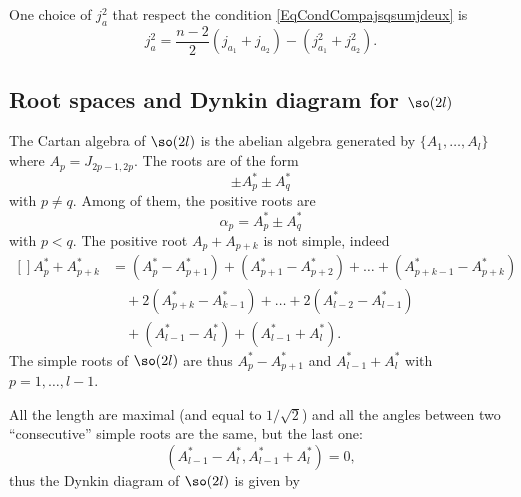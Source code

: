 One choice of $j_a^2$ that respect the condition \eqref{EqCondCompajsqsumjdeux} is
\begin{equation}
	j_a^2=\frac{ n-2 }{2}(j_{a_1}+j_{a_2})-(j_{a_1}^2+j_{a_2}^2).
\end{equation}

\subsection{Root spaces and Dynkin diagram for \texorpdfstring{$\so(2l)$}{so(21)}}

The Cartan algebra of $\so(2l)$ is the abelian algebra generated by $\{ A_1,\ldots,A_l \}$ where $A_p=J_{2p-1,2p}$. The roots are of the form
\begin{equation}
	\pm A_p^*\pm A^*_q
\end{equation}
with $p\neq q$. Among of them, the positive roots are
\begin{equation}
	\alpha_p=A^*_p\pm A^*_q
\end{equation}
with $p<q$. The positive root $A_p+A_{p+k}$ is not simple, indeed
\begin{equation}
	\begin{aligned}[]
		A^*_p+A^*_{p+k}	&= (A^*_p-A^*_{p+1})+(A^*_{p+1}-A^*_{p+2})+\ldots+(A^*_{p+k-1}-A^*_{p+k})\\
		&\quad +2(A^*_{p+k}-A^*_{k-1})+\ldots+2(A^*_{l-2}-A^*_{l-1})\\
		&\quad +(A^*_{l-1}-A^*_l)+(A^*_{l-1}+A^*_l).
	\end{aligned}
\end{equation}
The simple roots of $\so(2l)$ are thus $A^*_p-A^*_{p+1}$ and $A^*_{l-1}+A^*_l$ with $p=1,\ldots,l-1$.

All the length are maximal (and equal to $1/\sqrt{2}$) and all the angles between two ``consecutive'' simple roots are the same, but the last one:
\begin{equation}
	(A^*_{l-1}-A^*_{l},A^*_{l-1}+A^*_{l})=0,
\end{equation}
thus the Dynkin diagram of $\so(2l)$ is given by
\begin{center}
   
\end{center}

